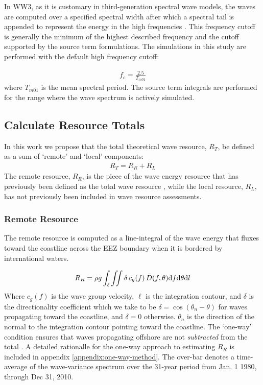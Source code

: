 In WW3, as it is customary in third-generation spectral wave models, the waves are computed over a specified spectral width after which a spectral tail is appended to represent the energy in the high frequencies \citep[e.g.][]{ardhuinObservationSwellDissipation2009}. This frequency cutoff is generally the minimum of the highest described frequency and the cutoff supported by the source term formulations. The simulations in this study are performed with the default high frequency cutoff:

\begin{align}
  f_{c} = \frac{2.5}{T_{m01}}
\end{align}
where $T_{m01}$ is the mean spectral period. The source term integrals are performed for the range where the wave spectrum is actively simulated.

\subsection{Calculate Resource Totals} \label{sec:method:calc}

In this work we propose that the total theoretical wave resource, $R_T$, be defined as a sum of `remote' and `local' components:
\begin{align}
  R_T = R_R + R_L
\end{align}
The remote resource, $R_R$, is the piece of the wave energy resource that has previously been defined as the total wave resource \citep{gunnQuantifyingGlobalWave2012,EPRIwaveresource2011}, while the local resource, $R_L$, has not previously been included in wave resource assessments.

\subsubsection{Remote Resource} \label{sec:method:calc:remote}

The remote resource is computed as a line-integral of the wave energy that fluxes toward the coastline across the EEZ boundary when it is bordered by international waters. 

\begin{align}
  R_R = \rho g \int_{\ell}\iint \delta \, c_g(f) \, \bar{D}(f,\theta) \mathrm{d} f \mathrm{d} \theta \mathrm{d} l
\label{eqn:RR}
\end{align}
Where $c_g(f)$ is the wave group velocity, $\ell$ is the integration contour, and $\delta$ is the directionality coefficient which we take to be $\delta = \cos(\theta_n - \theta)$ for waves propagating toward the coastline, and $\delta = 0$ otherwise. $\theta_n$ is the direction of the normal to the integration contour pointing toward the coastline. The `one-way' condition ensures that waves propagating offshore are not {\em subtracted} from the total \citep[]{gunnQuantifyingGlobalWave2012}. A detailed rationalle for the one-way approach to estimating $R_R$ is included in appendix \ref{appendix:one-way-method}. The over-bar denotes a time-average of the wave-variance spectrum over the 31-year period from Jan. 1 1980, through Dec 31, 2010.

